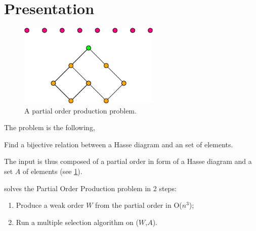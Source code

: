 \section{Presentation}
\label{tree:pop:presentation}

\begin{figure}
	\centering
	\includegraphics[width=0.6\textwidth]{fig/pop:diag}
	\caption{\label{fig:pop:diag} A partial order production problem.}
\end{figure}

The problem is the following,

Find a bijective relation between a Hasse diagram and an set of elements.

The input is thus composed of a partial order in form of a Hasse diagram and a set $A$ of elements (see \ref{fig:pop:diag}).

\cite{jcardin1} solves the Partial Order Production problem in 2 steps:

\begin{enumerate}
\item Produce a weak order $W$ from the partial order in O($n^3$);
\item Run a multiple selection algorithm on ($W$,$A$).
\end{enumerate}